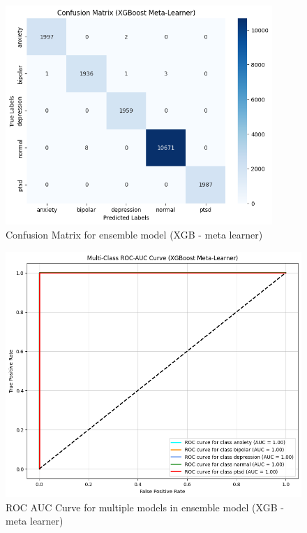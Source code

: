 \begin{figure}[h!]  
    \centering
    \includegraphics[width=0.9\textwidth]{Images/EM4 CM.png}  
    \caption{Confusion Matrix for ensemble model (XGB - meta learner)}
    \label{dfdl1244883}  %
\end{figure}

\begin{figure}[h!]  
    \centering
    \includegraphics[width=1.0\textwidth]{Images/EM4 ROC.png}  
    \caption{ROC AUC Curve for multiple models in ensemble model (XGB - meta learner)}
    \label{dfdl1244883}  %
\end{figure}


